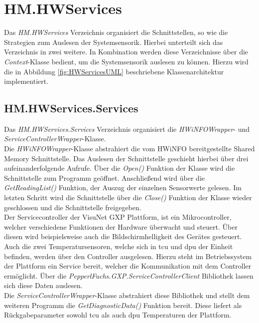 \section{HM.HWServices}
Das \textit{HM.HWServices} Verzeichnis organisiert die Schnittstellen, so wie die Strategien zum Auslesen der Systemsensorik. Hierbei unterteilt sich das Verzeichnis in zwei weitere. In Kombination werden diese Verzeichnisse über die \textit{Context}-Klasse bedient, um die Systemsensorik auslesen zu können. Hierzu wird die in Abbildung \ref{fig:HWServicesUML} beschriebene Klassenarchitektur implementiert.

\subsection{HM.HWServices.Services}
Das \textit{HM.HWServices.Services} Verzeichnis organisiert die \textit{HWiNFOWrapper}- und \textit{ServiceControllerWrapper}-Klasse.\\
Die \textit{HWiNFOWrapper}-Klasse abstrahiert die vom HWiNFO bereitgestellte Shared Memory Schnittstelle. Das Auslesen der Schnittstelle geschieht hierbei über drei aufeinanderfolgende Aufrufe. Über die \textit{Open()} Funktion der Klasse wird die Schnittstelle zum Programm geöffnet. Anschließend wird über die \textit{GetReadingList()} Funktion, der Auszug der einzelnen Sensorwerte gelesen. Im letzten Schritt wird die Schnittstelle über die \textit{Close()} Funktion der Klasse wieder geschlossen und die Schnittstelle freigegeben.\\
Der Servicecontroller der VisuNet GXP Plattform, ist ein Mikrocontroller, welcher verschiedene Funktionen der Hardware überwacht und steuert. Über diesen wird beispielsweise auch die Bildschirmhelligkeit des Gerätes gesteuert. Auch die zwei Temperatursensoren, welche sich in \ac{tcu} und \ac{dpu} der Einheit befinden, werden über den Controller ausgelesen. Hierzu steht im Betriebssystem der Plattform ein Service bereit, welcher die Kommunikation mit dem Controller ermöglicht. Über die \textit{PepperlFuchs.GXP.ServiceControllerClient} Bibliothek lassen sich diese Daten auslesen.\\
Die \textit{ServiceControllerWrapper}-Klasse abstrahiert diese Bibliothek und stellt dem weiteren Programm die \textit{GetDiagnosticData()} Funktion bereit. Diese liefert als Rückgabeparameter sowohl \ac{tcu} als auch \ac{dpu} Temperaturen der Plattform.

